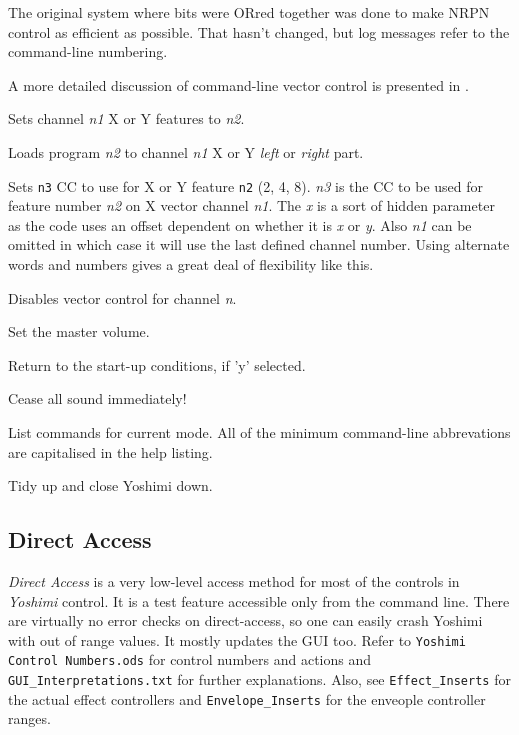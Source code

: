       The original system where bits were ORred together was done to make NRPN
      control as efficient as possible. That hasn't changed, but log messages
      refer to the command-line numbering.

      A more detailed discussion of command-line vector control is presented in
      .

      Sets channel \textsl{n1} X or Y features to \textsl{n2}.

      Loads program \textsl{n2} to channel \textsl{n1} X or Y
      \textsl{left} or \textsl{right} part.

      Sets \texttt{n3} CC to use for X or Y feature \texttt{n2} (2, 4, 8).
      \textsl{n3} is the CC to be used for feature number \textsl{n2} on X
      vector channel \textsl{n1}. The \textsl{x} is a sort of hidden parameter
      as the code uses an offset dependent on whether it is \textsl{x} or
      \textsl{y}. Also \textsl{n1} can be omitted in which case it will use the
      last defined channel number. Using alternate words and numbers gives a
      great deal of flexibility like this.

      Disables vector control for channel \textsl{n}.

      Set the master volume.

      Return to the start-up conditions, if 'y' selected.

      Cease all sound immediately!

      List commands for current mode.  All of the minimum command-line
      abbrevations are capitalised in the help listing.

         Tidy up and close Yoshimi down.

\subsection{Direct Access}
\label{subsec:command_line_direct_access}

   \textsl{Direct Access} is a very low-level access method for most of the
   controls in \textsl{Yoshimi} control.
   It is a test feature accessible only from the command line.
   There are virtually no error checks on direct-access, so one can easily
   crash Yoshimi with out of range values.
   It mostly updates the GUI too.
   Refer to \texttt{Yoshimi Control Numbers.ods}
   for control numbers and actions and \texttt{GUI\_Interpretations.txt} for
   further explanations.
   Also, see \texttt{Effect\_Inserts} for the actual effect controllers and
   \texttt{Envelope\_Inserts} for the enveople controller ranges.


